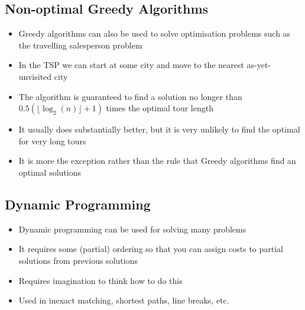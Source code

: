 
\begin{slide}
\section[-1]{Non-optimal Greedy Algorithms}

\begin{PauseHighLight}
  \begin{itemize}
  \item Greedy algorithms can also be used to solve optimisation
    problems such as the travelling salesperson problem\pause
  \item In the TSP we can start at some city and move to the nearest
    as-yet-unvisited city\pause
  \item The algorithm is guaranteed to find a solution no longer than
    $0.5(\lfloor \log_2(n)\rfloor +1)$ times the optimal tour length\pause
  \item It usually does substantially better, but it is very unlikely to
    find the optimal for very long tours\pause
  \item It is more the exception rather than the rule that Greedy
    algorithms find an optimal solutions\pause
  \end{itemize}
\end{PauseHighLight}

\end{slide}


\begin{slide}
\section{Dynamic Programming}

\begin{PauseHighLight}
  \begin{itemize}
  \item Dynamic programming can be used for solving many problems\pause
  \item It requires some (partial) ordering so that you can assign costs
    to partial solutions from previous solutions\pause
  \item Requires imagination to think how to do this\pause
  \item Used in inexact matching, shortest paths, line breaks, etc.\pause
  \end{itemize}
\end{PauseHighLight}

\end{slide}

